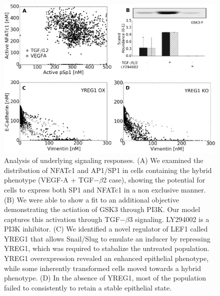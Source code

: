 \documentclass[11pt,letterpaper]{article}
\begin{document}
\clearpage

\begin{figure}
\includegraphics [width=1.0\linewidth] {./figs/Fig4_mechanism.pdf}
\caption{Analysis of underlying signaling responses.
(A) We examined the distribution of NFATc1 and AP1/SP1 in cells containing the hybrid phenotype (VEGF-A + TGF$-\beta$2 case), showing the potential for cells to express both SP1 and NFATc1 in a non exclusive manner.
(B) We were able to show a fit to an additional objective demonstrating the actiation of GSK3 through PI3K. Our model captures this activation through TGF$-\beta$3 signaling. LY294002 is a PI3K inhibitor.
(C) We identified a novel regulator of LEF1 called YREG1 that allows Snail/Slug to emulate an inducer by repressing YREG1, which was required to stabalize the untreated population.
YREG1 overexpression revealed an enhanced epithelial phenotype, while some inherently transformed cells moved towards a hybrid phenotype.
(D) In the absence of YREG1, most of the population failed to consistently to retain a stable epithelial state.}\label{fg:F4}
\end{figure}

\clearpage
\end{document}

